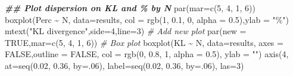 \documentclass[
  10pt,
  b5paper,
  oneside]{book}
\newenvironment{Shaded}{\begin{snugshade}}{\end{snugshade}}
\newcommand{\AttributeTok}[1]{\textcolor[rgb]{0.77,0.63,0.00}{#1}}
\newcommand{\CommentTok}[1]{\textcolor[rgb]{0.56,0.35,0.01}{\textit{#1}}}
\newcommand{\ConstantTok}[1]{\textcolor[rgb]{0.00,0.00,0.00}{#1}}
\newcommand{\DecValTok}[1]{\textcolor[rgb]{0.00,0.00,0.81}{#1}}
\newcommand{\DocumentationTok}[1]{\textcolor[rgb]{0.56,0.35,0.01}{\textbf{\textit{#1}}}}
\newcommand{\FloatTok}[1]{\textcolor[rgb]{0.00,0.00,0.81}{#1}}
\newcommand{\FunctionTok}[1]{\textcolor[rgb]{0.00,0.00,0.00}{#1}}
\newcommand{\NormalTok}[1]{#1}
\newcommand{\SpecialCharTok}[1]{\textcolor[rgb]{0.00,0.00,0.00}{#1}}
\newcommand{\StringTok}[1]{\textcolor[rgb]{0.31,0.60,0.02}{#1}}
\begin{document}
\begin{Shaded}
\begin{Highlighting}[]
  \DocumentationTok{\#\# Plot dispersion on KL and \% by N}
  \FunctionTok{par}\NormalTok{(}\AttributeTok{mar=}\FunctionTok{c}\NormalTok{(}\DecValTok{5}\NormalTok{, }\DecValTok{4}\NormalTok{, }\DecValTok{1}\NormalTok{, }\DecValTok{6}\NormalTok{))}
  \FunctionTok{boxplot}\NormalTok{(Perc }\SpecialCharTok{\textasciitilde{}}\NormalTok{ N, }\AttributeTok{data=}\NormalTok{results, }\AttributeTok{col =} \FunctionTok{rgb}\NormalTok{(}\DecValTok{1}\NormalTok{, }\FloatTok{0.1}\NormalTok{, }\DecValTok{0}\NormalTok{, }\AttributeTok{alpha =} \FloatTok{0.5}\NormalTok{),}\AttributeTok{ylab =} \StringTok{"\%"}\NormalTok{)}
  \FunctionTok{mtext}\NormalTok{(}\StringTok{"KL divergence"}\NormalTok{,}\AttributeTok{side=}\DecValTok{4}\NormalTok{,}\AttributeTok{line=}\DecValTok{3}\NormalTok{)}
  \CommentTok{\# Add new plot}
  \FunctionTok{par}\NormalTok{(}\AttributeTok{new =} \ConstantTok{TRUE}\NormalTok{,}\AttributeTok{mar=}\FunctionTok{c}\NormalTok{(}\DecValTok{5}\NormalTok{, }\DecValTok{4}\NormalTok{, }\DecValTok{1}\NormalTok{, }\DecValTok{6}\NormalTok{))}
  \CommentTok{\# Box plot}
  \FunctionTok{boxplot}\NormalTok{(KL }\SpecialCharTok{\textasciitilde{}}\NormalTok{ N, }\AttributeTok{data=}\NormalTok{results, }\AttributeTok{axes =} \ConstantTok{FALSE}\NormalTok{,}\AttributeTok{outline =} \ConstantTok{FALSE}\NormalTok{,}
          \AttributeTok{col =} \FunctionTok{rgb}\NormalTok{(}\DecValTok{0}\NormalTok{, }\FloatTok{0.8}\NormalTok{, }\DecValTok{1}\NormalTok{, }\AttributeTok{alpha =} \FloatTok{0.5}\NormalTok{), }\AttributeTok{ylab =} \StringTok{""}\NormalTok{)}
  \FunctionTok{axis}\NormalTok{(}\DecValTok{4}\NormalTok{, }\AttributeTok{at=}\FunctionTok{seq}\NormalTok{(}\FloatTok{0.02}\NormalTok{, }\FloatTok{0.36}\NormalTok{, }\AttributeTok{by=}\NormalTok{.}\DecValTok{06}\NormalTok{),  }\AttributeTok{label=}\FunctionTok{seq}\NormalTok{(}\FloatTok{0.02}\NormalTok{, }\FloatTok{0.36}\NormalTok{, }\AttributeTok{by=}\NormalTok{.}\DecValTok{06}\NormalTok{), }\AttributeTok{las=}\DecValTok{3}\NormalTok{)}
\end{Highlighting}
\end{Shaded}
\end{document}
